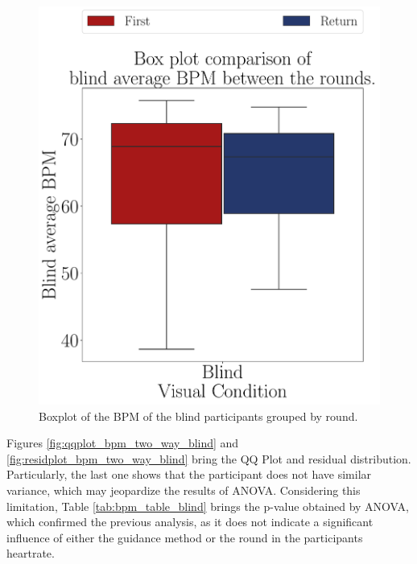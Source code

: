 \begin{figure}[!htb]
\begin{minipage}{0.45\textwidth}
        \includegraphics[width = \textwidth]{Resultados/ECG/Figuras/pdf/boxplot_ecg_bpm_blind_rounds.pdf}
        \caption{Boxplot of the BPM of the blind participants grouped by round.}
        \label{fig:boxplot_ecg_bpm_blind_rounds}
    \end{minipage}
\end{figure}

Figures \ref{fig:qqplot_bpm_two_way_blind} and \ref{fig:residplot_bpm_two_way_blind} bring the QQ Plot and residual distribution. Particularly, the last one shows that the participant does not have similar variance, which may jeopardize the results of ANOVA. Considering this limitation, Table \ref{tab:bpm_table_blind} brings the p-value obtained by ANOVA, which confirmed the previous analysis, as it does not indicate a significant influence of either the guidance method or the round in the participants heartrate. 

